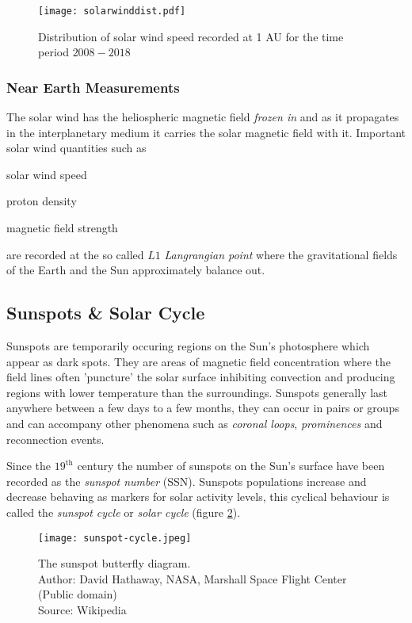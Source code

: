 \begin{figure}
    \noindent\centering\texttt{[image: solarwinddist.pdf]}
    \caption{
        {\small Distribution of solar wind speed recorded at 1 AU for the time period $2008 - 2018$}}
    \label{fig:solarwinddist}
\end{figure}

\subsubsection*{Near Earth Measurements}

The solar wind has the heliospheric magnetic field \emph{frozen in} and as it propagates in the interplanetary medium 
it carries the solar magnetic field with it. Important solar wind quantities such as 
\begin{enumerate*} \item solar wind speed \item proton density \item magnetic field strength \end{enumerate*} are recorded 
at the so called $L1$ \emph{Langrangian point} where the gravitational fields of the Earth and the Sun 
approximately balance out.



\subsection{Sunspots \& Solar Cycle}\label{sec:sunspots}

Sunspots are temporarily occuring regions on the Sun's photosphere which appear as dark spots. They are areas 
of magnetic field concentration where the field lines often 'puncture' the solar surface inhibiting convection 
and producing regions with lower temperature than the surroundings. Sunspots generally last anywhere between a 
few days to a few months, they can occur in pairs or groups and can accompany other phenomena such as 
\emph{coronal loops}, \emph{prominences} and reconnection events.

Since the $19^{\text{th}}$ century the number of sunspots on the Sun's surface have been recorded as the 
\emph{sunspot number} (SSN). Sunspots populations increase and decrease behaving as markers for solar activity levels, 
this cyclical behaviour is called the \emph{sunspot cycle} or \emph{solar cycle} (figure \ref{fig:SolarCycle}). 

\begin{figure}
    \noindent\texttt{[image: sunspot-cycle.jpeg]}
    \caption{{\small The sunspot butterfly diagram.  \\ 
    Author: David Hathaway, NASA, Marshall Space Flight Center (Public domain) \\ 
    Source: Wikipedia}}
    \label{fig:SolarCycle}
\end{figure}

